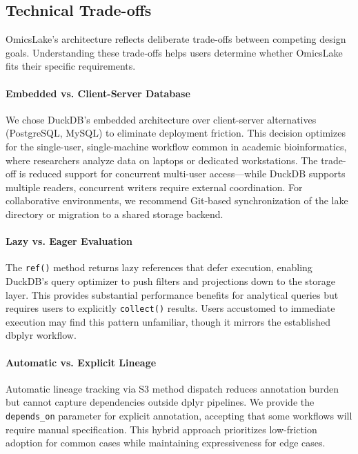 \documentclass[11pt,a4paper]{article}
\begin{document}
\subsection{Technical Trade-offs}

OmicsLake's architecture reflects deliberate trade-offs between competing design goals. Understanding these trade-offs helps users determine whether OmicsLake fits their specific requirements.

\paragraph{Embedded vs. Client-Server Database}
We chose DuckDB's embedded architecture over client-server alternatives (PostgreSQL, MySQL) to eliminate deployment friction. This decision optimizes for the single-user, single-machine workflow common in academic bioinformatics, where researchers analyze data on laptops or dedicated workstations. The trade-off is reduced support for concurrent multi-user access---while DuckDB supports multiple readers, concurrent writers require external coordination. For collaborative environments, we recommend Git-based synchronization of the lake directory or migration to a shared storage backend.

\paragraph{Lazy vs. Eager Evaluation}
The \texttt{ref()} method returns lazy references that defer execution, enabling DuckDB's query optimizer to push filters and projections down to the storage layer. This provides substantial performance benefits for analytical queries but requires users to explicitly \texttt{collect()} results. Users accustomed to immediate execution may find this pattern unfamiliar, though it mirrors the established dbplyr workflow.

\paragraph{Automatic vs. Explicit Lineage}
Automatic lineage tracking via S3 method dispatch reduces annotation burden but cannot capture dependencies outside dplyr pipelines. We provide the \texttt{depends\_on} parameter for explicit annotation, accepting that some workflows will require manual specification. This hybrid approach prioritizes low-friction adoption for common cases while maintaining expressiveness for edge cases.
\end{document}
